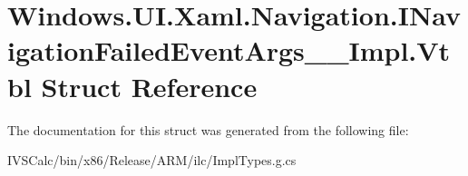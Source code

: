 \hypertarget{struct_windows_1_1_u_i_1_1_xaml_1_1_navigation_1_1_i_navigation_failed_event_args_____impl_1_1_vtbl}{}\section{Windows.\+U\+I.\+Xaml.\+Navigation.\+I\+Navigation\+Failed\+Event\+Args\+\_\+\+\_\+\+Impl.\+Vtbl Struct Reference}
\label{struct_windows_1_1_u_i_1_1_xaml_1_1_navigation_1_1_i_navigation_failed_event_args_____impl_1_1_vtbl}


The documentation for this struct was generated from the following file\+:\begin{DoxyCompactItemize}
\item 
I\+V\+S\+Calc/bin/x86/\+Release/\+A\+R\+M/ilc/Impl\+Types.\+g.\+cs\end{DoxyCompactItemize}
